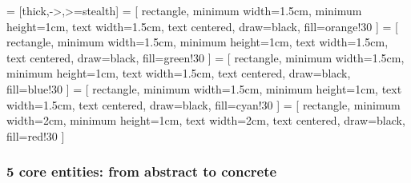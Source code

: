  = [thick,->,>=stealth]
     = [
        rectangle,
        minimum width=1.5cm,
        minimum height=1cm,
        text width=1.5cm,
        text centered,
        draw=black,
        fill=orange!30
    ]
     = [
        rectangle,
        minimum width=1.5cm,
        minimum height=1cm,
        text width=1.5cm,
        text centered,
        draw=black,
        fill=green!30
    ]
     = [
        rectangle,
        minimum width=1.5cm,
        minimum height=1cm,
        text width=1.5cm,
        text centered,
        draw=black,
        fill=blue!30
    ]
     = [
        rectangle,
        minimum width=1.5cm,
        minimum height=1cm,
        text width=1.5cm,
        text centered,
        draw=black,
        fill=cyan!30
    ]
     = [
        rectangle,
        minimum width=2cm,
        minimum height=1cm,
        text width=2cm,
        text centered,
        draw=black,
        fill=red!30
    ]

\begin{frame}
    \frametitle{5 core entities: from abstract to concrete}

    \centering


\end{frame}


